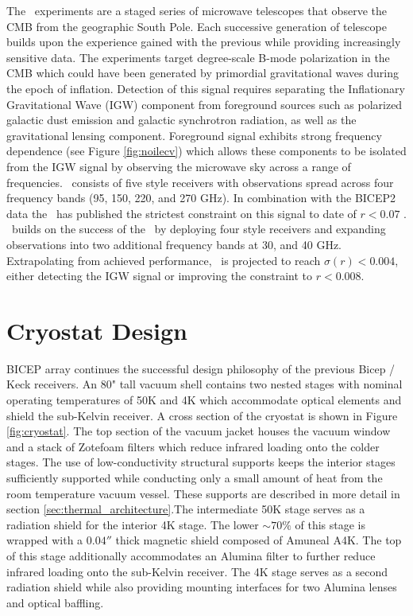 \documentclass[]{spie}  %
\begin{document}
The \bk \ experiments are a staged series of microwave telescopes that observe
the CMB from the geographic South Pole. Each successive generation of
telescope builds upon the experience gained with the previous while providing
increasingly sensitive data. The experiments target degree-scale B-mode
polarization in the CMB which could have been generated by primordial
gravitational waves during the epoch of inflation. Detection of this signal
requires separating the Inflationary Gravitational Wave (IGW) component from
foreground sources such as polarized galactic dust emission and galactic
synchrotron radiation, as well as the gravitational lensing component.
Foreground signal exhibits strong frequency dependence (see Figure
\ref{fig:noilecv}) which allows these components to be isolated from the IGW
signal by observing the microwave sky across a range of frequencies.
\keckarray \ consists of five  style receivers with observations spread
across four frequency bands (95, 150, 220, and 270 GHz). In combination with the BICEP2 data the \keckarray \ has
published the strictest constraint on this signal to date of $r<0.07$
\cite{bk14}. \biceparray \ builds on the success of the \keckarray \ by
deploying four  style receivers and expanding observations into two
additional frequency bands at 30, and 40 GHz. Extrapolating from achieved performance,
\biceparray \ is projected to reach $\sigma(r)<0.004$, either detecting the IGW
signal or improving the constraint to $r<0.008$. 





\section{Cryostat Design}

BICEP array continues the successful design philosophy of
the previous Bicep / Keck receivers. An 80" tall vacuum shell contains two nested
stages with nominal operating temperatures of 50K and 4K which accommodate
optical elements and shield the sub-Kelvin receiver. A cross section of
the cryostat is shown in Figure \ref{fig:cryostat}. The top section of the
vacuum jacket houses the vacuum window and a stack of Zotefoam filters which reduce infrared loading
onto the colder stages. The use of low-conductivity structural supports keeps
the interior stages sufficiently supported while conducting only a small
amount of heat from the room temperature vacuum vessel. These supports are
described in more detail in section \ref{sec:thermal_architecture}.The
intermediate 50K stage serves as a radiation shield for the interior 4K stage.
The lower $\sim70\%$ of this stage is wrapped with a $0.04''$ thick magnetic
shield composed of Amuneal A4K. The top of this stage additionally
accommodates an Alumina filter to further reduce infrared loading onto the
sub-Kelvin receiver. The 4K stage serves as a second radiation shield while
also providing mounting interfaces for two Alumina lenses and optical
baffling.
\end{document}
